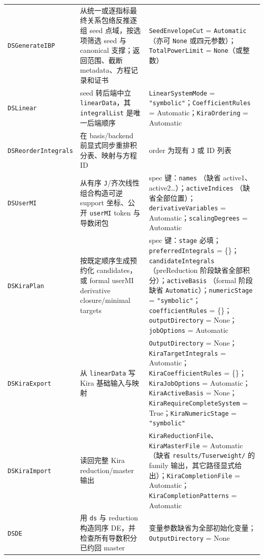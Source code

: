 ﻿\documentclass[a4paper,11pt]{article}
\begin{document}
\begin{longtable}{@{}>{\raggedright\arraybackslash}p{}>{\raggedright\arraybackslash}p{}>{\raggedright\arraybackslash}p{}@{}}
\texttt{DSGenerateIBP} & 从统一或逐指标最终关系包络反推逐组 seed 点域，按选项筛选 seed 与 canonical 支撑；返回范围、截断 metadata、方程记录和证书 & \texttt{SeedEnvelopeCut} = \texttt{Automatic}（亦可 \texttt{None} 或四元参数）；\allowbreak\texttt{TotalPowerLimit} = \texttt{None}（或整数） \\
\texttt{DSLinear} & seed 转后端中立 \texttt{linearData}，其 \texttt{integralList} 是唯一后端顺序 & \texttt{LinearSystemMode} = \texttt{"symbolic"}；\allowbreak\texttt{CoefficientRules} = Automatic；\allowbreak\texttt{KiraOrdering} = Automatic \\
\texttt{DSReorderIntegrals} & 在 basis/backend 前显式同步重排积分表、映射与方程 ID & order 为现有 \texttt{J} 或 ID 列表 \\
\texttt{DSUserMI} & 从有序 \texttt{J}/齐次线性组合构造可逆 support 坐标、公开 \texttt{userMI} token 与导数闭包 & spec 键：\texttt{names} （缺省 active1、active2…）；\allowbreak\texttt{activeIndices} （缺省全部位置）；\allowbreak\texttt{derivativeVariables} = Automatic；\allowbreak\texttt{scalingDegrees} = Automatic \\
\texttt{DSKiraPlan} & 按既定顺序生成预约化 candidates，或 formal userMI derivative closure/minimal targets & spec 键：\texttt{stage} 必填；\allowbreak\texttt{preferredIntegrals} = \{\}；\allowbreak\texttt{candidateIntegrals} （preReduction 阶段缺省全部积分）；\allowbreak\texttt{activeBasis} （formal 阶段缺省 \texttt{Automatic}）；\allowbreak\texttt{numericStage} = \texttt{"symbolic"}；\allowbreak\texttt{coefficientRules} = \{\}；\allowbreak\texttt{outputDirectory} = None；\allowbreak\texttt{jobOptions} = Automatic \\
\texttt{DSKiraExport} & 从 \texttt{linearData} 写 Kira 基础输入与映射 & \texttt{OutputDirectory} = None；\allowbreak\texttt{KiraTargetIntegrals} = Automatic；\allowbreak\texttt{KiraCoefficientRules} = \{\}；\allowbreak\texttt{KiraJobOptions} = Automatic；\allowbreak\texttt{KiraActiveBasis} = None；\allowbreak\texttt{KiraRequireCompleteSystem} = True；\allowbreak\texttt{KiraNumericStage} = \texttt{"symbolic"} \\
\texttt{DSKiraImport} & 读回完整 Kira reduction/master 输出 & \texttt{KiraReductionFile}、\allowbreak\texttt{KiraMasterFile} = Automatic （缺省 \texttt{results/Tuserweight/} 的 family 输出，其它路径显式给出）；\allowbreak\texttt{KiraCompletionFile} = Automatic；\allowbreak\texttt{KiraCompletionPatterns} = Automatic \\
\texttt{DSDE} & 用 \texttt{ds} 与 reduction 构造同序 DE，并检查所有导数积分已约回 master & 变量参数缺省为全部初始化变量；\allowbreak\texttt{OutputDirectory} = None \\

\end{longtable}
\end{document}
